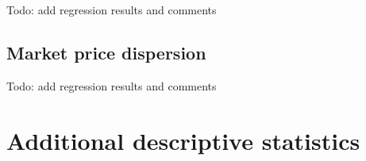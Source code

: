 \documentclass[english]{article}
\begin{document}
Todo: add regression results and comments

\subsection{Market price dispersion}

Todo: add regression results and comments

\newpage



\newpage

\appendix

\section{Additional descriptive statistics}
\end{document}
